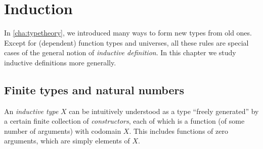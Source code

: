 \let\zero\emptyt
\let\one\unit
\let\two\bool
\newcommand{\twoh}{\ensuremath{\mathbf{2^h}}\xspace}
\newcommand{\three}{\ensuremath{\mathbf{3}}\xspace}
\newcommand{\natw}{\ensuremath{\mathbf{N^w}}\xspace}
\newcommand{\nath}{\ensuremath{\mathbf{N^h}}\xspace}
\let\true\btrue
\let\false\bfalse
\newcommand{\z}{\ensuremath{0}\xspace}
\newcommand{\zw}{\ensuremath{0^\mathbf{w}}\xspace}
\newcommand{\myInd}{\ensuremath{\mathbf{Ind \;}}\xspace}
\let\s\suc
\newcommand{\sw}{\ensuremath{\mathbf{s^w}}\xspace}
\newcommand{\alt}{\;|\;\;}
\newcommand{\disj}[2]{#1 + #2}
\newcommand{\dbl}{\ensuremath{\mathbf{double}}}
\newcommand{\nalg}{\mathsf{\nat Alg}}
\newcommand{\nhom}{\mathsf{\nat Hom}}
\newcommand{\ishinitw}{\ensuremath{\mathsf{isHinit_W}}}
\newcommand{\ishinitn}{\ensuremath{\mathsf{isHinit_\nat}}}
\newcommand{\w}{\mathsf{W}}
\newcommand{\walg}{\mathsf{\w Alg}}
\newcommand{\whom}{\mathsf{\w Hom}}

\chapter{Induction}
\label{cha:induction}

In \autoref{cha:typetheory}, we introduced many ways to form new types from old ones.
Except for (dependent) function types and universes, all these rules are special cases of the general notion of \emph{inductive definition}.
In this chapter we study inductive definitions more generally.


\section{Finite types and natural numbers}
\label{sec:bool-nat}

An \emph{inductive type} $X$ can be intuitively understood as a type ``freely generated'' by a certain finite collection of \emph{constructors}, each of which is a function (of some number of arguments) with codomain $X$.
This includes functions of zero arguments, which are simply elements of $X$.

